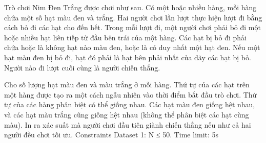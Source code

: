 Trò chơi Nim Đen Trắng được chơi như sau. Có một hoặc nhiều hàng, mỗi hàng chứa một số hạt màu đen và trắng. Hai người chơi lần lượt thực hiện lượt đi bằng cách bỏ đi các hạt cho đến hết. Trong mỗi lượt đi, một người chơi phải bỏ đi một hoặc nhiều hạt liên tiếp từ đầu bên trái của một hàng. Các hạt bị bỏ đi phải chứa hoặc là không hạt nào màu đen, hoặc là có duy nhất một hạt đen. Nếu một hạt màu đen bị bỏ đi, hạt đó phải là hạt bên phải nhất của dãy các hạt bị bỏ. Người nào đi lượt cuối cùng là người chiến thắng.  

   Cho số lượng hạt màu đen và màu trắng ở mỗi hàng. Thứ tự của các hạt trên một hàng được tạo ra một cách ngẫu nhiên vào thời điểm bắt đầu trò chơi. Thứ tự của các hàng phân biệt có thể giống nhau. Các hạt màu đen giống hệt nhau, và các hạt màu trắng cũng giống hệt nhau (không thể phân biệt các hạt cùng màu). In ra xác suất mà người chơi đầu tiên giành chiến thắng nếu như cả hai người đều chơi tối ưu.
Constraints
Dataset 1: N ≤ 50. Time limit: 5s